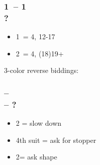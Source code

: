 \subsubsection*{1\mins\ -- 1\hearts\ \\
                ?}
\begin{itemize}
    \item 1\spades\ = 4\spades, 12-17
    \item 2\spades\ = 4\spades, (18)19+
\end{itemize}

3-color reverse biddings:

\subsubsection*{ --  \\  -- ?}
\begin{itemize}
    \item 2 = slow down
    \item 4th suit = ask for stopper \gf
    \item 2\nt = ask shape \gf
\end{itemize}




